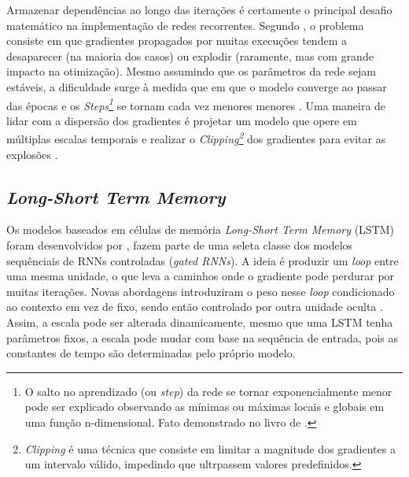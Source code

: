 Armazenar dependências ao longo das iterações é certamente o principal desafio matemático na implementação de redes recorrentes.
Segundo \cite{graves}, o problema consiste em que gradientes propagados por muitas execuções tendem a desaparecer (na maioria dos casos) ou explodir (raramente, mas com grande impacto na otimização).
Mesmo assumindo que os parâmetros da rede sejam estáveis, a dificuldade surge à medida que em que o modelo converge ao passar das épocas e os 
\textit{Steps\footnote{ O salto no aprendizado (ou \textit{step}) da rede se tornar exponencialmente menor pode ser explicado observando as mínimas ou máximas locais e globais em uma função n-dimensional. Fato demonstrado no livro de \textcite{stewart}.}} 
se tornam cada vez menores menores \cite{Good}.
Uma maneira de lidar com a dispersão dos gradientes é projetar um modelo que opere em múltiplas escalas temporais \cite{Bengio} e realizar o 
\textit{Clipping\footnote{\textit{Clipping} é uma técnica que consiste em limitar a magnitude dos gradientes a um intervalo válido, impedindo que ultrpassem valores predefinidos.}} dos gradientes para evitar as explosões \cite{Exp}.

\subsection{\textit{Long-Short Term Memory}} \label{sec:lstm}
Os modelos baseados em células de memória \textit{Long-Short Term Memory} (LSTM) foram desenvolvidos por \textcite{Hoch}, fazem parte de uma seleta classe dos modelos sequênciais de RNNs controladas (\textit{gated RNNs}).
A ideia é produzir um \textit{loop} entre uma mesma unidade, o que leva a caminhos onde o gradiente pode perdurar por muitas iterações.
Novas abordagens introduziram o peso nesse \textit{loop} condicionado ao contexto em vez de fixo, sendo então controlado por outra unidade oculta \cite{Gers}. 
Assim, a escala pode ser alterada dinamicamente, mesmo que uma LSTM tenha parâmetros fixos, a escala pode mudar com base na sequência 
de entrada, pois as constantes de tempo são determinadas pelo próprio modelo.

